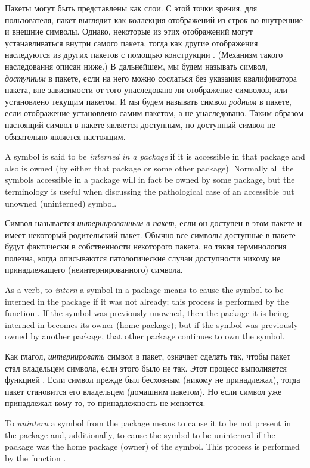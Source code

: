 Пакеты могут быть представлены как слои. С этой точки зрения, для пользователя,
пакет выглядит как коллекция отображений из строк во внутренние и внешние
символы. Однако, некоторые из этих отображений могут устанавливаться внутри
самого пакета, тогда как другие отображения наследуются из других пакетов с
помощью конструкции . (Механизм такого наследования описан
ниже.) В дальнейшем, мы будем называть символ, \emph{доступным} в пакете, если
на него можно сослаться без указания квалификатора пакета, вне зависимости от
того унаследовано ли отображение символов, или установлено текущим пакетом. И мы
будем называть символ \emph{родным} в пакете, если отображение установлено
самим пакетом, а не унаследовано. Таким образом настоящий символ в пакете
является доступным, но доступный символ не обязательно является настоящим.

A symbol is said to be \emph{interned in a package} if it is
accessible in that package and also is owned (by either that package
or some other package).  Normally all the symbols accessible in
a package will in fact be owned by some package,
but the terminology is useful when
discussing the pathological case of an accessible but unowned (uninterned)
symbol.

Символ называется \emph{интернированным в пакет}, если он доступен в этом
пакете и имеет некоторый родительский пакет. Обычно все символы
доступные в пакете будут фактически в собственности некоторого пакета, но такая
терминология полезна, когда описываются патологические случаи доступности
никому не принадлежащего (неинтернированного) символа.

As a verb, to \emph{intern} a symbol in a package means to cause the
symbol to be interned in the package if it was not already;
this process is performed by the function .
If the symbol was previously unowned, then the package it is being
interned in becomes its owner (home package); but
if the symbol was previously owned by another package, that other package
continues to own the symbol.

Как глагол, \emph{интернировать} символ в пакет, означает сделать так, чтобы
пакет стал владельцем символа, если этого было не так.
Этот процесс выполняется функцией .
Если символ прежде был бесхозным (никому не принадлежал), тогда пакет становится
его владельцем (домашним пакетом). Но если символ уже принадлежал кому-то, то
принадлежность не меняется.

To \emph{unintern} a symbol from the package means to cause it to be not
present in the package
and, additionally, to cause the symbol to be uninterned if the
package was the home package (owner) of the symbol.
This process is performed by the function .

